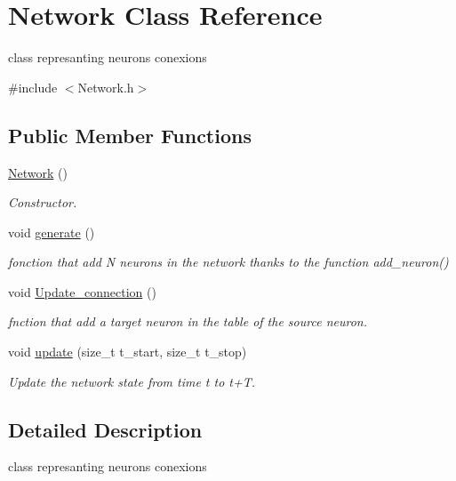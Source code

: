 \hypertarget{classNetwork}{\section{Network Class Reference}
\label{classNetwork}
}


class represanting neurons conexions  




{\ttfamily \#include $<$Network.\-h$>$}

\subsection*{Public Member Functions}
\begin{DoxyCompactItemize}
\item 
\hyperlink{classNetwork_a3cc2fb4f8fa4d507077e8da85ce5a1c8}{Network} ()
\begin{DoxyCompactList}\small\item\em Constructor. \end{DoxyCompactList}\item 
\hypertarget{classNetwork_ada5ad9d86ab3d81803140410e22d82af}{void \hyperlink{classNetwork_ada5ad9d86ab3d81803140410e22d82af}{generate} ()}\label{classNetwork_ada5ad9d86ab3d81803140410e22d82af}

\begin{DoxyCompactList}\small\item\em fonction that add N neurons in the network thanks to the function add\-\_\-neuron() \end{DoxyCompactList}\item 
void \hyperlink{classNetwork_a6291ac92355a8790b74dc7b327439e6f}{Update\-\_\-connection} ()
\begin{DoxyCompactList}\small\item\em fnction that add a target neuron in the table of the source neuron. \end{DoxyCompactList}\item 
void \hyperlink{classNetwork_accb4454cc984031041b277556634f646}{update} (size\-\_\-t t\-\_\-start, size\-\_\-t t\-\_\-stop)
\begin{DoxyCompactList}\small\item\em Update the network state from time t to t+\-T. \end{DoxyCompactList}\end{DoxyCompactItemize}


\subsection{Detailed Description}
class represanting neurons conexions 

